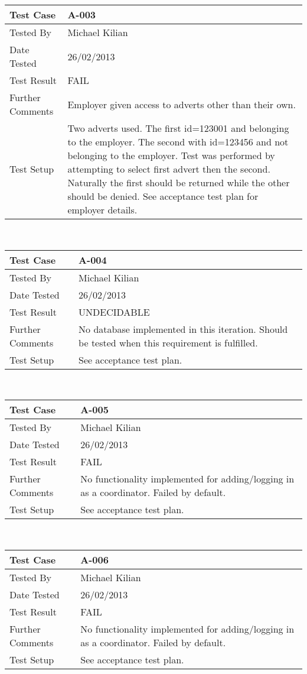 \documentclass{l3deliverable}
\begin{document}
\begin{tabular}{lp{10cm}}
\hline 
\textbf{Test Case} & A-003\tabularnewline
\hline 
\hline 
Tested By & Michael Kilian\tabularnewline
\hline 
Date Tested & 26/02/2013\tabularnewline
\hline 
Test Result & FAIL\tabularnewline
\hline
Further Comments &  Employer given access to adverts other than their own. \tabularnewline
\hline
Test Setup &  Two adverts used. The first id=123001 and belonging to the employer. The second with id=123456 and not belonging to the employer. Test was performed by attempting to select first advert then the second. Naturally the first should be returned while the other should be denied. See acceptance test plan for employer details. \tabularnewline
\hline
\end{tabular}\\

\begin{tabular}{lp{10cm}}
\hline 
\textbf{Test Case} & A-004\tabularnewline
\hline 
\hline 
Tested By & Michael Kilian\tabularnewline
\hline 
Date Tested & 26/02/2013\tabularnewline
\hline 
Test Result & UNDECIDABLE\tabularnewline
\hline
Further Comments &  No database implemented in this iteration. Should be tested when this requirement is fulfilled. \tabularnewline
\hline
Test Setup &  See acceptance test plan. \tabularnewline
\hline
\end{tabular}\\

\begin{tabular}{lp{10cm}}
\hline 
\textbf{Test Case} & A-005\tabularnewline
\hline 
\hline 
Tested By & Michael Kilian\tabularnewline
\hline 
Date Tested & 26/02/2013\tabularnewline
\hline 
Test Result & FAIL\tabularnewline
\hline
Further Comments &  No functionality implemented for adding/logging in as a coordinator. Failed by default. \tabularnewline
\hline
Test Setup &  See acceptance test plan. \tabularnewline
\hline
\end{tabular}\\

\begin{tabular}{lp{10cm}}
\hline 
\textbf{Test Case} & A-006\tabularnewline
\hline 
\hline 
Tested By & Michael Kilian\tabularnewline
\hline 
Date Tested & 26/02/2013\tabularnewline
\hline 
Test Result & FAIL\tabularnewline
\hline
Further Comments &  No functionality implemented for adding/logging in as a coordinator. Failed by default. \tabularnewline
\hline
Test Setup &  See acceptance test plan. \tabularnewline
\hline
\end{tabular}\\
\end{document}
